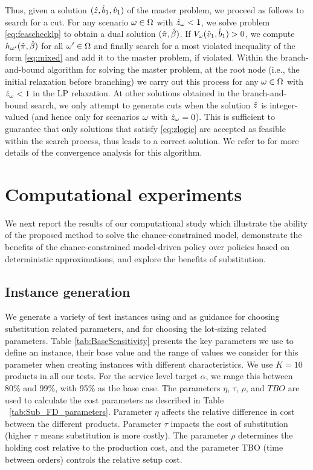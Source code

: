 \documentclass[msom]{oo}
\begin{document}
Thus, given a solution $(\hat{z},\hat{b}_1,\hat{v}_1)$ of the master problem, we proceed as follows to search for a cut. For any scenario $\omega \in \Omega$ with $\hat{z}_{\omega} < 1$, we solve problem \eqref{eq:feaschecklp} to obtain a dual solution $(\hat{\pi},\hat{\beta})$. If $V_\omega(\hat{v}_1,\hat{b}_1) > 0$, we compute $h_{\omega'}(\hat{\pi},\hat{\beta})$ for all $\omega' \in \Omega$ and finally search for a most violated inequality of the form \eqref{eq:mixed} and add it to the master problem, if violated. Within the branch-and-bound algorithm for solving the master problem, at the root node (i.e., the initial relaxation before branching) we carry out this process for any $\omega \in \Omega$ with $\hat{z}_{\omega} < 1$ in the LP relaxation. At other solutions obtained in the branch-and-bound search, we only attempt to generate cuts when the solution $\hat{z}$ is integer-valued (and hence only for scenarios $\omega$ with $\hat{z}_{\omega}=0$). This is sufficient to guarantee that only solutions that satisfy \eqref{eq:zlogic} are accepted as feasible within the search process, thus leads to a correct solution. We refer to \citep{luedtke2014branch} for more details of the convergence analysis for this algorithm.
  

\section{Computational experiments}
\label{sec:comp}
We next report the results of our computational study which illustrate the ability of the proposed method to solve the chance-constrained model, demonstrate the benefits of the chance-constrained model-driven policy over policies based on deterministic approximations, and explore the benefits of substitution.

\subsection{Instance generation}

We generate a variety of test instances using \citep{rao2004multi} and \citep{hsu2005dynamic} as guidance for choosing substitution related parameters, and \citep{helber2013dynamic} for choosing the lot-sizing related parameters.
Table \ref{tab:BaseSensitivity} presents the key parameters we use to define an instance, their base value and the range of values we consider for this parameter when creating instances with different characteristics. We use $K=10$ products in all our tests. For the service level target $\alpha$, we range this between 80\% and 99\%, with 95\% as the base case.  The parameters $\eta$, $\tau$, $\rho$, and $TBO$  are used to calculate the cost parameters as described in Table
~\ref{tab:Sub_FD_parameters}. Parameter $\eta$ affects the relative difference in cost between the different products. Parameter $\tau$ impacts the cost of substitution (higher $\tau$ means substitution is more costly). The parameter $\rho$ determines the holding cost relative to the production cost, and the parameter TBO (time between orders) controls the relative setup cost. 
\end{document}
